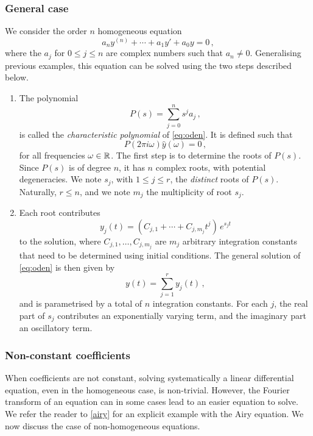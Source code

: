 \subsubsection{General case}
We consider the order $n$ homogeneous equation
\begin{equation}
  a_ny^{(n)}+\cdots+a_1y'+a_0y=0\,,\label{eq:oden}
\end{equation}
where the $a_j$ for $0\leq j\leq n$ are complex numbers such that $a_n\neq 0$.
Generalising previous examples, this equation can be solved using the two steps described
below.
\begin{enumerate}
  \item The polynomial
    \begin{equation}
      P(s)=\sum_{j=0}^{n} s^ja_j\,,
    \end{equation}
    is called the \emph{characteristic polynomial} of \cref{eq:oden}. It is defined such
    that
    \begin{equation}
      P(2\pi i\omega)\hat{y}(\omega)=0\,,
    \end{equation}
    for all frequencies $\omega\in\mathbb{R}$. The first step is to determine the roots of $P(s)$.
    Since $P(s)$ is of degree $n$, it has $n$ complex roots, with potential degeneracies.
    We note $s_j$, with $1\leq j\leq r$, the \emph{distinct} roots of $P(s)$. Naturally,
    $r\leq n$, and we note $m_j$ the multiplicity of root $s_j$.
  \item Each root contributes
    \begin{equation}
      y_j(t)=(C_{j,1}+\cdots+C_{j,m_j}t^j)\,e^{s_jt}
    \end{equation}
    to the solution, where $C_{j,1},\dots,C_{j,m_j}$ are $m_j$ arbitrary integration
    constants that need to be determined using initial conditions. The general solution of
    \cref{eq:oden} is then given by
    \begin{equation}
      y(t)=\sum_{j=1}^{r}y_j(t)\,,
    \end{equation}
    and is parametrised by a total of $n$ integration constants. For each $j$, the real
    part of $s_j$ contributes an exponentially varying term, and the imaginary part an
    oscillatory term.
\end{enumerate}
\subsubsection{Non-constant coefficients}
When coefficients are not constant, solving systematically a linear differential equation,
even in the homogeneous case, is non-trivial. However, the Fourier transform of an
equation can in some cases lead to an easier equation to solve. We refer the reader to
\cref{airy} for an explicit example with the Airy equation. We now discuss the case of
non-homogeneous equations.
